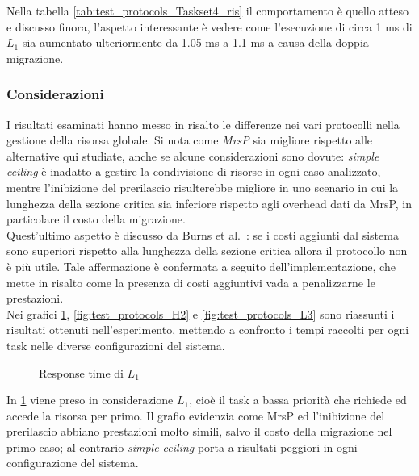 \noindent Nella tabella \ref{tab:test_protocols_Taskset4_ris} il comportamento è quello atteso e discusso finora, l'aspetto interessante è vedere come l'esecuzione di circa 1 ms di $L_1$ sia aumentato ulteriormente da 1.05 ms a 1.1 ms a causa della doppia migrazione.

\subsubsection{Considerazioni}
\label{sec:confronto_protocolli_cons}

\noindent I risultati esaminati hanno messo in risalto le differenze nei vari protocolli nella gestione della risorsa globale. Si nota come \textit{MrsP} sia migliore rispetto alle alternative qui studiate, anche se alcune considerazioni sono dovute: \textit{simple ceiling} è inadatto a gestire la condivisione di risorse in ogni caso analizzato, mentre l'inibizione del prerilascio risulterebbe migliore in uno scenario in cui la lunghezza della sezione critica sia inferiore rispetto agli overhead dati da MrsP, in particolare il costo della migrazione.\\

\noindent Quest'ultimo aspetto è discusso da Burns et al.~\cite{Burns:2013:SCM:2547348.2547350}: se i costi aggiunti dal sistema sono superiori rispetto alla lunghezza della sezione critica allora il protocollo non è più utile. Tale affermazione è confermata a seguito dell'implementazione, che mette in risalto come la presenza di costi aggiuntivi vada a penalizzarne le prestazioni.\\

\noindent Nei grafici \ref{fig:test_protocols_L1}, \ref{fig:test_protocols_H2} e \ref{fig:test_protocols_L3} sono riassunti i risultati ottenuti nell'esperimento, mettendo a confronto i tempi raccolti per ogni task nelle diverse configurazioni del sistema.\\

\begin{figure}
  \centering
  \confrontoProtocolliLUno
  \caption{Response time di $L_1$}
  \label{fig:test_protocols_L1}
\end{figure}

\noindent In \ref{fig:test_protocols_L1} viene preso in considerazione $L_1$, cioè il task a bassa priorità che richiede ed accede la risorsa per primo. Il grafio evidenzia come MrsP ed l'inibizione del prerilascio abbiano prestazioni molto simili, salvo il costo della migrazione nel primo caso; al contrario \textit{simple ceiling} porta a risultati peggiori in ogni configurazione del sistema.\\

